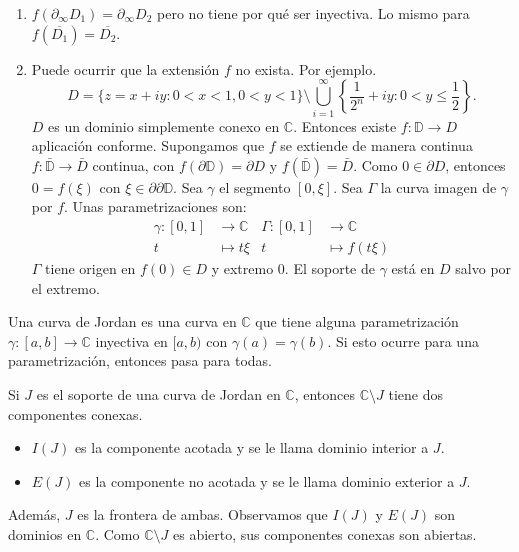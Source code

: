 \begin{remark}
    \hfill
    \begin{enumerate}
        \item $f(\partial_\infty D_1) = \partial_\infty D_2$ pero no tiene por qué ser inyectiva.
              Lo mismo para $f(\overline{D_1}) = \overline{D_2}$.
        \item Puede ocurrir que la extensión $f$ no exista.
              Por ejemplo.
              $$D = \{z = x + iy : 0 < x < 1, 0 < y < 1\} \setminus \bigcup_{i=1}^\infty \left\{\frac{1}{2^n} + iy : 0 < y \leq \frac{1}{2}\right\}.$$
              $D$ es un dominio simplemente conexo en $\mathbb{C}$.
              Entonces existe $f: \mathbb{D} \to D$ aplicación conforme.
              Supongamos que $f$ se extiende de manera continua $f: \bar{\mathbb{D}} \to \bar{D}$ continua, con $f(\partial\mathbb{D}) = \partial D$ y $f(\bar{\mathbb{D}}) = \bar{D}$.
              Como $0 \in \partial D$, entonces $0 = f(\xi)$ con $\xi \in \partial \partial\mathbb{D}$.
              Sea $\gamma$ el segmento $[0, \xi]$.
              Sea $\Gamma$ la curva imagen de $\gamma$ por $f$.
              Unas parametrizaciones son:
              \begin{align*}
                  \gamma: [0, 1] & \to \mathbb{C} & \Gamma: [0, 1] & \to \mathbb{C}  \\
                  t              & \mapsto t\xi   & t              & \mapsto f(t\xi)
              \end{align*}
              $\Gamma$ tiene origen en $f(0) \in D$ y extremo 0.
              El soporte de $\gamma$ está en $D$ salvo por el extremo.
    \end{enumerate}
\end{remark}

Una curva de Jordan es una curva en $\mathbb{C}$ que tiene alguna parametrización $\gamma: [a, b] \to \mathbb{C}$ inyectiva en $[a, b)$ con $\gamma(a) = \gamma(b)$.
Si esto ocurre para una parametrización, entonces pasa para todas.

Si $J$ es el soporte de una curva de Jordan en $\mathbb{C}$, entonces $\mathbb{C} \setminus J$ tiene dos componentes conexas.
\begin{itemize}
    \item $I(J)$ es la componente acotada y se le llama dominio interior a $J$.
    \item $E(J)$ es la componente no acotada y se le llama dominio exterior a $J$.
\end{itemize}
Además, $J$ es la frontera de ambas.
Observamos que $I(J)$ y $E(J)$ son dominios en $\mathbb{C}$.
Como $\mathbb{C} \setminus J$ es abierto, sus componentes conexas son abiertas.

